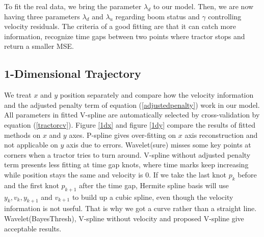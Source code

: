 To fit the real data, we bring the parameter $\lambda_d$ to our model. Then, we are now having three parameters $\lambda_d$ and $\lambda_u$ regarding boom status and $\gamma$ controlling velocity residuals. The criteria of a good fitting are that it can catch more information, recognize time gaps between two points where tractor stops and return a smaller MSE. 



\subsection{1-Dimensional Trajectory}

We treat $x$ and $y$ position separately and compare how the velocity information and the adjusted penalty term of equation (\ref{adjustedpenalty}) work in our model. All parameters in fitted V-spline are automatically selected by cross-validation by equation (\ref{tractorcv}). Figure \ref{1dx} and figure \ref{1dy} compare the results of fitted methods on $x$ and $y$ axes. P-spline gives over-fitting on $x$ axis reconstruction and not applicable on $y$ axis due to errors. Wavelet(sure) misses some key points at corners when a tractor tries to turn around. V-spline without adjusted penalty term presents less fitting at time gap knots, where time marks keep increasing while position stays the same and velocity is 0. If we take the last knot $p_k$ before and the first knot $p_{k+1}$ after the time gap, Hermite spline basis will use $y_k, v_k, y_{k+1}$ and $v_{k+1}$ to build up a cubic spline, even though the velocity information is not useful. That is why we got a curve rather than a straight line. Wavelet(BayesThresh), V-spline without velocity and proposed V-spline give acceptable results.


